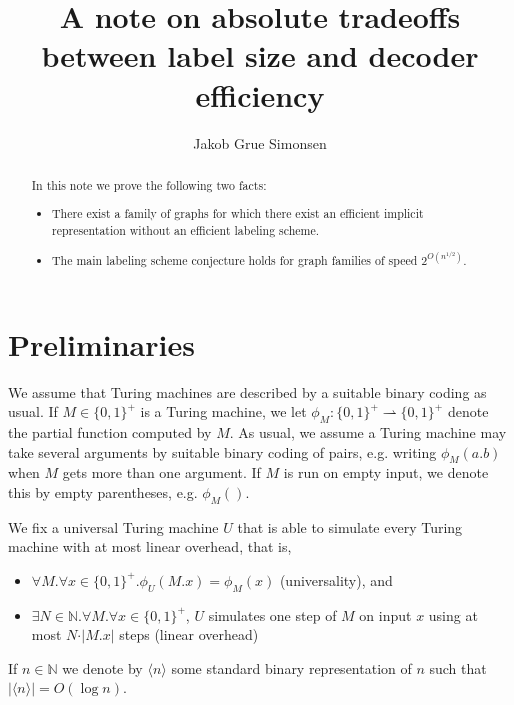\documentclass{article}
\title{A note on absolute tradeoffs between label size and decoder efficiency}
\author{Jakob Grue Simonsen}
\date{}
\newcommand{\bincode}[1]{\ensuremath{\langle #1 \rangle}}
\begin{document}
\maketitle
\begin{abstract}
In this note we prove the following two facts:
\begin{itemize}
\item There exist a family of graphs for which there exist an efficient implicit representation without an efficient labeling scheme.
\item The main labeling scheme conjecture holds for graph families of speed $2^{O(n^{1/2})}$.
\end{itemize}
\end{abstract}
\section{Preliminaries}
We assume that Turing machines are described
by a suitable binary coding as usual. If $M \in \{0,1\}^+$ is a Turing machine, we 
let $\phi_M : \{0,1\}^+ \rightharpoonup \{0,1\}^+$ denote
the partial function computed by $M$. As usual, we assume a Turing machine may take
several arguments by suitable binary coding of pairs, e.g. writing $\phi_M(a.b)$ when $M$ gets more than
one argument. If $M$ is run on empty input, we denote this by empty parentheses, e.g.
$\phi_M()$.

We fix a universal Turing machine $U$ that is able to simulate every Turing machine
with at most linear overhead, that is,
\begin{itemize}
\item $\forall M . \forall x \in \{0,1\}^+ . \phi_U(M.x) = \phi_M(x)$ (universality), and
\item $\exists N \in \mathbb{N} . \forall M . \forall x \in \{0,1\}^+ $, $U$ simulates one step of $M$
on input $x$ using at most $N \cdot \vert M.x \vert$ steps (linear overhead)

\end{itemize}

If $n \in \mathbb{N}$ we denote by $\bincode{n}$ some standard binary representation of $n$ such that
$\vert \bincode{n} \vert = O(\log n)$.

\end{document}
